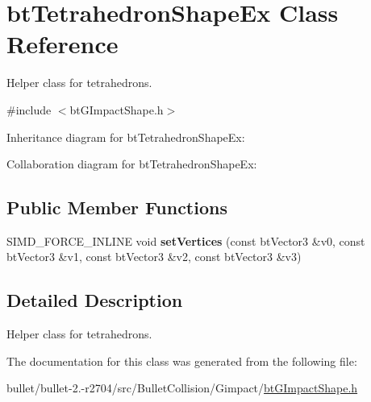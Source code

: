 \hypertarget{classbt_tetrahedron_shape_ex}{\section{bt\+Tetrahedron\+Shape\+Ex Class Reference}
\label{classbt_tetrahedron_shape_ex}
}


Helper class for tetrahedrons.  




{\ttfamily \#include $<$bt\+G\+Impact\+Shape.\+h$>$}



Inheritance diagram for bt\+Tetrahedron\+Shape\+Ex\+:


Collaboration diagram for bt\+Tetrahedron\+Shape\+Ex\+:
\subsection*{Public Member Functions}
\begin{DoxyCompactItemize}
\item 
\hypertarget{classbt_tetrahedron_shape_ex_aedc474fcbdbcae1d02e09547a7b67319}{S\+I\+M\+D\+\_\+\+F\+O\+R\+C\+E\+\_\+\+I\+N\+L\+I\+N\+E void {\bfseries set\+Vertices} (const bt\+Vector3 \&v0, const bt\+Vector3 \&v1, const bt\+Vector3 \&v2, const bt\+Vector3 \&v3)}\label{classbt_tetrahedron_shape_ex_aedc474fcbdbcae1d02e09547a7b67319}

\end{DoxyCompactItemize}


\subsection{Detailed Description}
Helper class for tetrahedrons. 

The documentation for this class was generated from the following file\+:\begin{DoxyCompactItemize}
\item 
bullet/bullet-\/2.-\/r2704/src/\+Bullet\+Collision/\+Gimpact/\hyperlink{bt_g_impact_shape_8h}{bt\+G\+Impact\+Shape.\+h}\end{DoxyCompactItemize}
